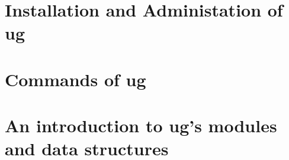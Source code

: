 \newpage
{
\small
\tableofcontents
}
\clearpage

\pagestyle{plain}
\section{Installation and Administation of ug}
\renewcommand{\sectitle}{Installation and Administation}


\pagestyle{plain}
\section{Commands of ug}
\renewcommand{\sectitle}{Commands}


\pagestyle{plain}
\section{An introduction to ug's modules and data structures}
\renewcommand{\sectitle}{modules and data structures}



